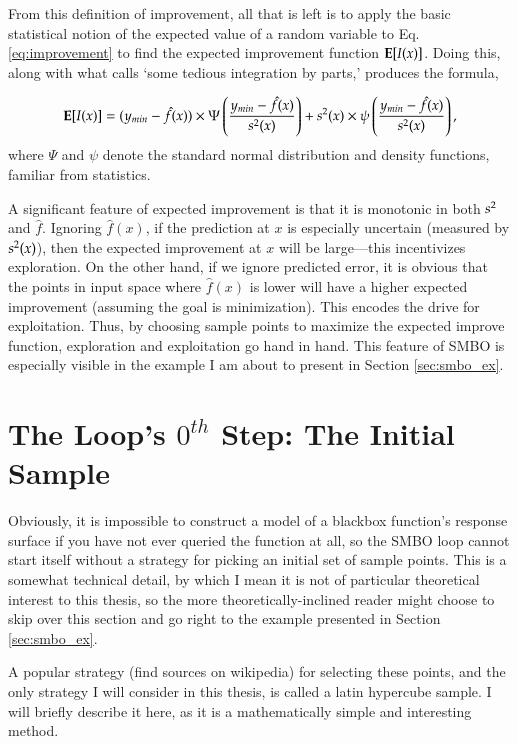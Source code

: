 From this definition of improvement, all that is left is to apply the basic statistical notion of the expected value of a random variable to Eq. \ref{eq:improvement} to find the expected improvement function $\mathbf{E}[I(x)]$. Doing this, along with what \cite{jones_efficient_1998} calls `some tedious integration by parts,' produces the formula,

\begin{equation} \label{eq:exp_improvement}
\mathbf{E}[I(x)]=(y_{min}-\hat{f}(x))\times\Psi\left(\frac{y_{min}-\hat{f}(x)}{s^2(x)}\right) + s^2(x)\times\psi\left(\frac{y_{min}-\hat{f}(x)}{s^2(x)}\right),
\end{equation}
where $\Psi$ and $\psi$ denote the standard normal distribution and density functions, familiar from statistics.

A significant feature of expected improvement is that it is monotonic in both $s^2$ and $\hat{f}$. Ignoring $\hat{f}(x)$, if the prediction at $x$ is especially uncertain (measured by $s^2(x)$), then the expected improvement at $x$ will be large---this incentivizes exploration. On the other hand, if we ignore predicted error, it is obvious that the points in input space where $\hat{f}(x)$ is lower will have a higher expected improvement (assuming the goal is minimization). This encodes the drive for exploitation. Thus, by choosing sample points to maximize the expected improve function, exploration and exploitation go hand in hand. This feature of SMBO is especially visible in the example I am about to present in Section \ref{sec:smbo_ex}.

\section{The Loop's $0^{th}$ Step: The Initial Sample}\label{sec:lh}

Obviously, it is impossible to construct a model of a blackbox function's response surface if you have not ever queried the function at all, so the SMBO loop cannot start itself without a strategy for picking an initial set of sample points. This is a somewhat technical detail, by which I mean it is not of particular theoretical interest to this thesis, so the more theoretically-inclined reader might choose to skip over this section and go right to the example presented in Section \ref{sec:smbo_ex}.

A popular strategy (find sources on wikipedia) for selecting these points, and the only strategy I will consider in this thesis, is called a latin hypercube sample. I will briefly describe it here, as it is a mathematically simple and interesting method.


